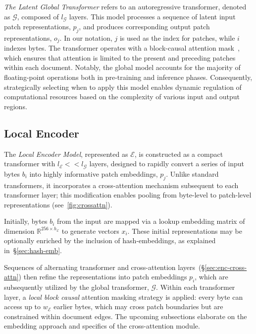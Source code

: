 \textit{The Latent Global Transformer} refers to an autoregressive transformer, denoted as $\mathcal{G}$, composed of $l_{\mathcal{G}}$ layers. This model processes a sequence of latent input patch representations, $p_j$, and produces corresponding output patch representations, $o_j$. In our notation, $j$ is used as the index for patches, while $i$ indexes bytes. The transformer operates with a block-causal attention mask~\citep{dubey2024llama}, which ensures that attention is limited to the present and preceding patches within each document. Notably, the global model accounts for the majority of floating-point operations both in pre-training and inference phases. Consequently, strategically selecting when to apply this model enables dynamic regulation of computational resources based on the complexity of various input and output regions.

\subsection{Local Encoder}
\label{section:local}

The \textit{Local Encoder Model}, represented as $\mathcal{E}$, is constructed as a compact transformer with $l_{\mathcal{E}} << l_{\mathcal{G}}$ layers, designed to rapidly convert a series of input bytes $b_i$ into highly informative patch embeddings, $p_j$. Unlike standard transformers, it incorporates a cross-attention mechanism subsequent to each transformer layer; this modification enables pooling from byte-level to patch-level representations (see~\autoref{fig:crossattn}).

Initially, bytes $b_i$ from the input are mapped via a lookup embedding matrix of dimension $\mathbb{R}^{256 \times h_{\mathcal{E}}}$ to generate vectors $x_i$. These initial representations may be optionally enriched by the inclusion of hash-embeddings, as explained in~\S\ref{sec:hash-emb}.

Sequences of alternating transformer and cross-attention layers~(\S\ref{sec:enc-cross-attn}) then refine the representations into patch embeddings $p_i$, which are subsequently utilized by the global transformer, $\mathcal{G}$. Within each transformer layer, a \textit{local block causal} attention masking strategy is applied: every byte can access up to $w_{\mathcal{E}}$ earlier bytes, which may cross patch boundaries but are constrained within document edges. The upcoming subsections elaborate on the embedding approach and specifics of the cross-attention module.

